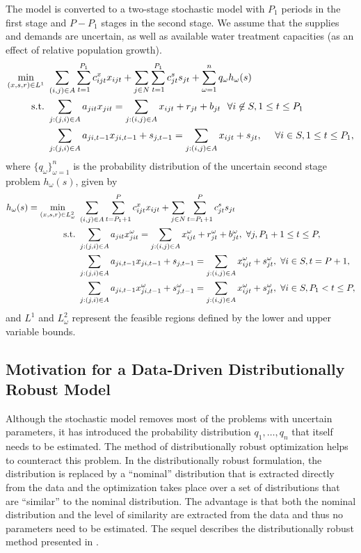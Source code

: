 \documentclass[11pt]{article}
\theoremstyle{plain}
\theoremstyle{definition}
\theoremstyle{remark}
\newcommand{\st}{\mbox{s.t.}}
\begin{document}
The model is converted to a two-stage stochastic model with $P_1$ periods in the first stage and $P-P_1$ stages in the second stage.
We assume that the supplies and demands are uncertain, as well as available water treatment capacities (as an effect of relative population growth).
\begin{align}
	\min_{(x,s,r) \in L^1} \ & \sum_{(i,j) \in A} \sum_{t=1}^{P_1} c_{ijt}^x x_{ijt} + \sum_{j \in N} \sum_{t=1}^{P_1} c_{jt}^s s_{jt} + \sum_{\omega=1}^n q_\omega h_\omega(s) \label{eq:gen_network_two_stage} \\
	\st \ & \sum_{j : (j,i) \in A} a_{jit} x_{jit} = \sum_{j : (i,j) \in A} x_{ijt} + r_{jt} + b_{jt} \ \ \forall i \not\in S, 1 \leq t \leq P_1 \notag \\
	& \sum_{j : (j,i) \in A} a_{ji,t-1} x_{ji,t-1} + s_{j,t-1} = \sum_{j : (i,j) \in A} x_{ijt} + s_{jt},\ \ \ \ \forall i \in S, 1 \leq t \leq P_1, \notag
\end{align}
where $\{q_\omega\}_{\omega = 1}^n$ is the probability distribution of the uncertain second stage problem $h_\omega(s)$, given by
\begin{align}
	h_\omega(s) = \min_{(x,s,r) \in L^2_\omega} \ & \sum_{(i,j) \in A} \sum_{t=P_1+1}^{P} c_{ijt}^x x_{ijt} + \sum_{j \in N} \sum_{t=P_1+1}^{P} c_{jt}^s s_{jt} \label{eq:gen_network_second_stage} \\
	\st \ & \sum_{j : (j,i) \in A} a_{jit} x_{jit}^\omega = \sum_{j : (i,j) \in A} x_{ijt}^\omega + r_{jt}^\omega + b_{jt}^\omega, \ \forall j, P_1+1 \leq t \leq P, \notag \\
	& \sum_{j : (j,i) \in A} a_{ji,t-1} x_{ji,t-1} + s_{j,t-1} = \sum_{j : (i,j) \in A} x_{ijt}^\omega + s_{jt}^\omega,\ \forall i \in S, t = P+1, \notag \\
	& \sum_{j : (j,i) \in A} a_{ji,t-1} x_{ji,t-1}^\omega + s_{j,t-1}^\omega = \sum_{j : (i,j) \in A} x_{ijt}^\omega + s_{jt}^\omega,\ \forall i \in S, P_1 < t \leq P, \notag
\end{align}
and $L^1$ and $L^2_\omega$ represent the feasible regions defined by the lower and upper variable bounds.

\subsection{Motivation for a Data-Driven Distributionally Robust Model}

Although the stochastic model removes most of the problems with uncertain parameters, it has introduced the probability distribution $q_1, \dots, q_n$ that itself needs to be estimated.
The method of distributionally robust optimization helps to counteract this problem.
In the distributionally robust formulation, the distribution is replaced by a ``nominal'' distribution that is extracted directly from the data and the optimization takes place over a set of distributions that are ``similar'' to the nominal distribution.
The advantage is that both the nominal distribution and the level of similarity are extracted from the data and thus no parameters need to be estimated.
The sequel describes the distributionally robust method presented in \citep{love2013phi}.
\end{document}
